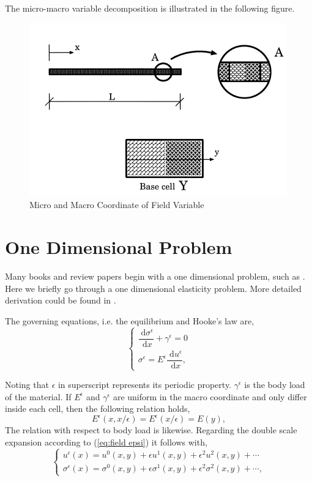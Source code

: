 \documentclass[10pt,a4paper]{scrreprt}
\newcommand{\myd}{\;\mathrm{d}}
\begin{document}
The micro-macro variable decomposition is illustrated in the following figure.

\begin{figure}[h]
  \centering
    \label{fig: scale sepa}
    \includegraphics[width=0.45\linewidth]{../pics/ref_cell_mic_mac_coord.png}
  \caption{Micro and Macro Coordinate of Field Variable \citep{hassani1998review}}
\end{figure}

\section{One Dimensional Problem}
Many books and review papers begin with a one dimensional problem, such as \citep{cioranescu_introduction_2000}. Here we briefly go through a one dimensional elasticity problem. More detailed derivation could be found in \citep{hassani1998review}.

The governing equations, i.e. the equilibrium and Hooke's law are,
\begin{equation}
\left\{
\begin{array}{l}
\dfrac{\myd{\sigma^{\epsilon}}}{\myd{x}} + \gamma^{\epsilon} = 0 \\
\sigma^{\epsilon} = E^{\epsilon} \dfrac{\myd{u^{\epsilon}}}{\myd{x}},
\end{array}
\right.
\end{equation}

Noting that $\epsilon$ in superscript represents its periodic property. $\gamma^{\epsilon}$ is the body load of the material. If $E^{\epsilon}$ and $\gamma^{\epsilon}$ are uniform in the macro coordinate and only differ inside each cell, then the following relation holds,
\begin{equation}
E^{\epsilon}(x,x/\epsilon)=E^{\epsilon}(x/\epsilon)=E(y),
\end{equation}
The relation with respect to body load is likewise. Regarding the double scale expansion according to (\ref{eq:field epsi}) it follows with,
\begin{equation}
\label{eq:1st 1d}
\left\{
\begin{array}{l}
u^{\epsilon}(x) = u^{0}(x,y) + \epsilon u^{1}(x,y) + \epsilon^{2} u^{2}(x,y) + \cdots \\
\sigma^{\epsilon}(x) = \sigma^{0}(x,y) + \epsilon \sigma^{1}(x,y) + \epsilon^{2} \sigma^{2}(x,y) + \cdots,
\end{array}
\right.
\end{equation}
\end{document}
